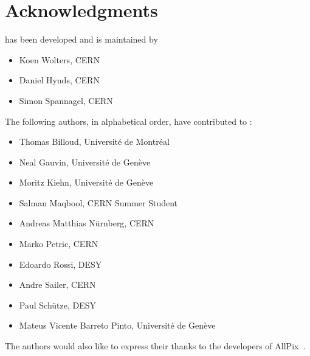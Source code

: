 \chapter{Acknowledgments}

\apsq has been developed and is maintained by

\begin{itemize}
\item Koen Wolters, CERN
\item Daniel Hynds, CERN
\item Simon Spannagel, CERN
\end{itemize}

The following authors, in alphabetical order, have contributed to \apsq:

\begin{itemize}
\item  Thomas Billoud, Université de Montréal
\item Neal Gauvin, Université de Genève
\item  Moritz Kiehn, Université de Genève
\item  Salman Maqbool, CERN Summer Student
\item  Andreas Matthias Nürnberg, CERN
\item  Marko Petric, CERN
\item  Edoardo Rossi, DESY
\item  Andre Sailer, CERN
\item  Paul Schütze, DESY
\item  Mateus Vicente Barreto Pinto, Université de Genève
\end{itemize}

The authors would also like to express their thanks to the developers of AllPix~\cite{ap1wiki,ap1git}.
